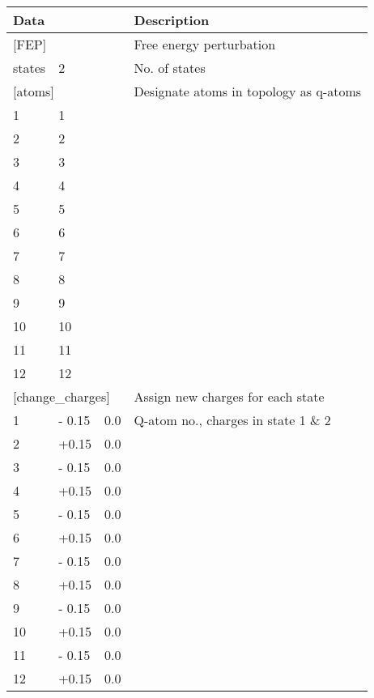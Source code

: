 \documentclass[a4paper,10pt]{article}
\begin{document}
\begin{longtable}{|p{30pt} p{30pt} p{30pt}|p{280pt}|}
  \hline \textbf{Data}    &    &     & \textbf{Description} \\
  \endhead
  \hline \multicolumn{3}{|l|}{[FEP]}   & Free energy perturbation \\
  \hline states  & 2     &     & No. of states \\
  \hline \multicolumn{3}{|l|}{[atoms]} & Designate atoms in topology as q-atoms \\
  \hline 1       & 1     &     & \\
  \hline 2       & 2     &     & \\
  \hline 3       & 3     &     & \\
  \hline 4       & 4     &     & \\
  \hline 5       & 5     &     & \\
  \hline 6       & 6     &     & \\
  \hline 7       & 7     &     & \\
  \hline 8       & 8     &     & \\
  \hline 9       & 9     &     & \\
  \hline 10      & 10    &     & \\
  \hline 11      & 11    &     & \\
  \hline 12      & 12    &     & \\
  \hline \multicolumn{3}{|l|}{[change{\_}charges]} & Assign new charges for each state \\
  \hline 1       & - 0.15 & 0.0 & Q-atom no., charges in state 1 \& 2 \\
  \hline 2       & +0.15  & 0.0 & \\
  \hline 3       & - 0.15 & 0.0 & \\
  \hline 4       & +0.15  & 0.0 & \\
  \hline 5       & - 0.15 & 0.0 & \\
  \hline 6       & +0.15  & 0.0 & \\
  \hline 7       & - 0.15 & 0.0 & \\
  \hline 8       & +0.15  & 0.0 & \\
  \hline 9       & - 0.15 & 0.0 & \\
  \hline 10      & +0.15  & 0.0 & \\
  \hline 11      & - 0.15 & 0.0 & \\
  \hline 12      & +0.15  & 0.0 & \\ \hline
\end{longtable}
\end{document}
